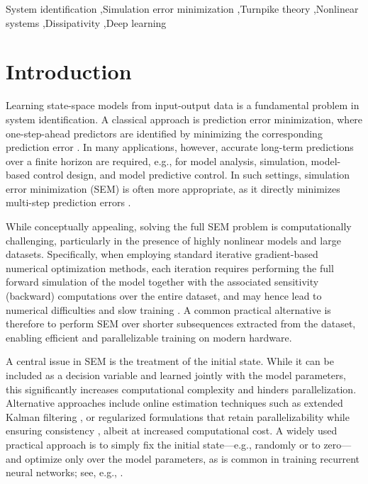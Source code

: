\documentclass[a4paper,fleqn]{cas-dc}
\begin{document}
\begin{keywords}
	System identification \sep Simulation error minimization \sep Turnpike theory \sep Nonlinear systems \sep Dissipativity \sep Deep learning
\end{keywords}

\maketitle


\section{Introduction}



Learning state-space models from input-output data is a fundamental problem in system identification. A classical approach is prediction error minimization, where one-step-ahead predictors are identified by minimizing the corresponding prediction error \cite{Ljung1999}.
In many applications, however, accurate long-term predictions over a finite horizon are required, e.g., for model analysis, simulation, model-based control design, and model predictive control. In such settings, simulation error minimization (SEM) is often more appropriate, as it directly minimizes multi-step prediction errors \cite{Farina2010c,Aguirre2010}.

While conceptually appealing, solving the full SEM problem is computationally challenging, particularly in the presence of highly nonlinear models and large datasets. Specifically, when employing standard iterative gradient-based numerical optimization methods, each iteration requires performing the full forward simulation of the model together with the associated sensitivity (backward) computations over the entire dataset, and may hence lead to numerical difficulties and slow training \cite{Ribeiro2020,AllenZhu2019,Ayed2019}. A common practical alternative is therefore to perform SEM over shorter subsequences extracted from the dataset, enabling efficient and parallelizable training on modern hardware.

A central issue in SEM is the treatment of the initial state. While it can be included as a decision variable and learned jointly with the model parameters, this significantly increases computational complexity and hinders parallelization. Alternative approaches include online estimation techniques such as extended Kalman filtering \cite{Bemporad2023}, or regularized formulations that retain parallelizability while ensuring consistency \cite{Forgione2021}, albeit at increased computational cost.
A widely used practical approach is to simply fix the initial state---e.g., randomly or to zero---and optimize only over the model parameters, as is common in training recurrent neural networks; see, e.g., \cite{Bonassi2022,Jaeger2002,Schiller2025b,Mohajerin2019,Forgione2022}.
\end{document}
